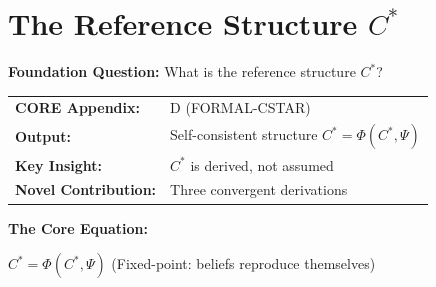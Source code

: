 %
%
%
%

\chapter{The Reference Structure $C^*$}
\label{ch:reference-structure}


\begin{tcolorbox}[
    colback=blue!5!white,
    colframe=blue!75!black,
    title={\textbf{9C CORE Connection: Foundation for HOW}},
    fonttitle=\bfseries
]
\textbf{Foundation Question:} What is the reference structure $C^*$?

\medskip
\begin{tabular}{ll}
\textbf{CORE Appendix:} & D (FORMAL-CSTAR) \\
\textbf{Output:} & Self-consistent structure $C^* = \Phi(C^*, \Psi)$ \\
\textbf{Key Insight:} & $C^*$ is derived, not assumed \\
\textbf{Novel Contribution:} & Three convergent derivations
\end{tabular}

\medskip
\textbf{The Core Equation:}
\begin{center}
$C^* = \Phi(C^*, \Psi)$ \quad (Fixed-point: beliefs reproduce themselves)
\end{center}
\end{tcolorbox}

